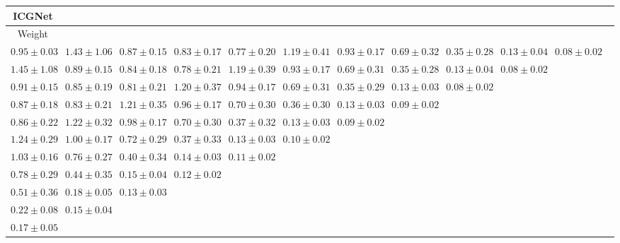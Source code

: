 \begin{table}[ht]
{{\begin{adjustbox}{width=\textwidth}
\begin{tabular}{cccccccccccc}
\hline
ICGNet &  &  &  &  &  &  &  &  &  & \\
\hline
Weight &  &  &  &  &  &  &  &  &  & \\
\hline
$0.95 \pm 0.03$ & $1.43 \pm 1.06$ & $0.87 \pm 0.15$ & $0.83 \pm 0.17$ & $0.77 \pm 0.20$ & $1.19 \pm 0.41$ & $0.93 \pm 0.17$ & $0.69 \pm 0.32$ & $0.35 \pm 0.28$ & $0.13 \pm 0.04$ & $0.08 \pm 0.02$ &  \\
$1.45 \pm 1.08$ & $0.89 \pm 0.15$ & $0.84 \pm 0.18$ & $0.78 \pm 0.21$ & $1.19 \pm 0.39$ & $0.93 \pm 0.17$ & $0.69 \pm 0.31$ & $0.35 \pm 0.28$ & $0.13 \pm 0.04$ & $0.08 \pm 0.02$ &  &  \\
$0.91 \pm 0.15$ & $0.85 \pm 0.19$ & $0.81 \pm 0.21$ & $1.20 \pm 0.37$ & $0.94 \pm 0.17$ & $0.69 \pm 0.31$ & $0.35 \pm 0.29$ & $0.13 \pm 0.03$ & $0.08 \pm 0.02$ &  &  &  \\
$0.87 \pm 0.18$ & $0.83 \pm 0.21$ & $1.21 \pm 0.35$ & $0.96 \pm 0.17$ & $0.70 \pm 0.30$ & $0.36 \pm 0.30$ & $0.13 \pm 0.03$ & $0.09 \pm 0.02$ &  &  &  &  \\
$0.86 \pm 0.22$ & $1.22 \pm 0.32$ & $0.98 \pm 0.17$ & $0.70 \pm 0.30$ & $0.37 \pm 0.32$ & $0.13 \pm 0.03$ & $0.09 \pm 0.02$ &  &  &  &  &  \\
$1.24 \pm 0.29$ & $1.00 \pm 0.17$ & $0.72 \pm 0.29$ & $0.37 \pm 0.33$ & $0.13 \pm 0.03$ & $0.10 \pm 0.02$ &  &  &  &  &  &  \\
$1.03 \pm 0.16$ & $0.76 \pm 0.27$ & $0.40 \pm 0.34$ & $0.14 \pm 0.03$ & $0.11 \pm 0.02$ &  &  &  &  &  &  &  \\
$0.78 \pm 0.29$ & $0.44 \pm 0.35$ & $0.15 \pm 0.04$ & $0.12 \pm 0.02$ &  &  &  &  &  &  &  &  \\
$0.51 \pm 0.36$ & $0.18 \pm 0.05$ & $0.13 \pm 0.03$ &  &  &  &  &  &  &  &  &  \\
$0.22 \pm 0.08$ & $0.15 \pm 0.04$ &  &  &  &  &  &  &  &  &  &  \\
$0.17 \pm 0.05$ &  &  &  &  &  &  &  &  &  &  &  \\



\end{tabular}
\end{adjustbox}}}
\end{table}

